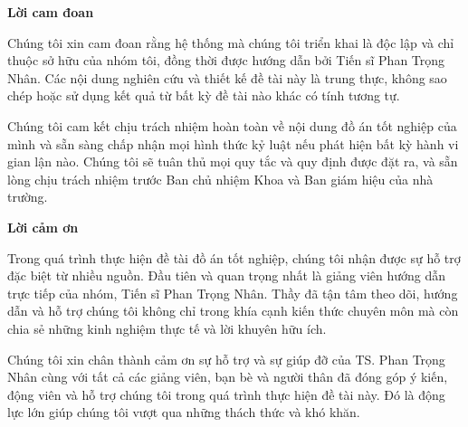 
\begin{center}
    \textbf{Lời cam đoan}
\end{center}

Chúng tôi xin cam đoan rằng hệ thống mà chúng tôi triển khai là độc lập và chỉ thuộc sở hữu của nhóm tôi, đồng thời được hướng dẫn bởi Tiến sĩ Phan Trọng Nhân. Các nội dung nghiên cứu và thiết kế đề tài này là trung thực, không sao chép hoặc sử dụng kết quả từ bất kỳ đề tài nào khác có tính tương tự.

Chúng tôi cam kết chịu trách nhiệm hoàn toàn về nội dung đồ án tốt nghiệp của mình và sẵn sàng chấp nhận mọi hình thức kỷ luật nếu phát hiện bất kỳ hành vi gian lận nào. Chúng tôi sẽ tuân thủ mọi quy tắc và quy định được đặt ra, và sẵn lòng chịu trách nhiệm trước Ban chủ nhiệm Khoa và Ban giám hiệu của nhà trường.

\newpage
\begin{center}
    \textbf{Lời cảm ơn}
\end{center}

Trong quá trình thực hiện đề tài đồ án tốt nghiệp, chúng tôi nhận được sự hỗ trợ đặc biệt từ nhiều nguồn. Đầu tiên và quan trọng nhất là giảng viên hướng dẫn trực tiếp của nhóm, Tiến sĩ Phan Trọng Nhân. Thầy đã tận tâm theo dõi, hướng dẫn và hỗ trợ chúng tôi không chỉ trong khía cạnh kiến thức chuyên môn mà còn chia sẻ những kinh nghiệm thực tế và lời khuyên hữu ích.

Chúng tôi xin chân thành cảm ơn sự hỗ trợ và sự giúp đỡ của TS. Phan Trọng Nhân cùng với tất cả các giảng viên, bạn bè và người thân đã đóng góp ý kiến, động viên và hỗ trợ chúng tôi trong quá trình thực hiện đề tài này. Đó là động lực lớn giúp chúng tôi vượt qua những thách thức và khó khăn.

